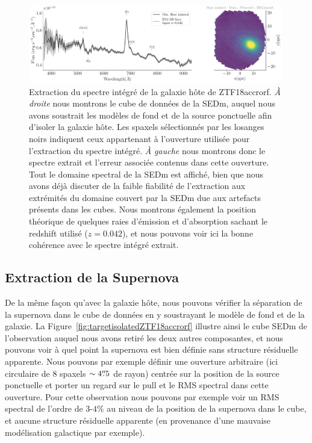 \documentclass[../main/main.tex]{subfiles}
\begin{document}
\begin{figure}[ht]
  \centering
  \includegraphics[width=0.99\textwidth]{../figures/07_scene/output_host_ZTF18accrorf.pdf}
  \caption[Extraction du spectre intégré de la galaxie hôte de
  ZTF18accrorf]{Extraction du spectre intégré de la galaxie hôte de
    ZTF18accrorf. \emph{À droite} nous montrons le cube de données de la
  SEDm, auquel nous avons soustrait les modèles de fond et de la source
  ponctuelle afin d'isoler la galaxie hôte. Les spaxels sélectionnés par
les losanges noirs indiquent ceux appartenant à l'ouverture utilisée
pour l'extraction du spectre intégré. \emph{À gauche} nous montrons donc le
spectre extrait et l'erreur associée contenus dans cette ouverture. Tout le domaine spectral
de la SEDm est affiché, bien que nous avons déjà discuter de la faible
fiabilité de l'extraction aux extrémités du domaine couvert par la SEDm due aux artefacts
présents dans les cubes. Nous montrons également la position
théorique de quelques raies d'émission et d'absorption sachant le
redshift utilisé ($z=0.042$), et nous pouvons voir ici la bonne cohérence avec le
spectre intégré extrait.}
  \label{fig:hostspecZTF18accrorf}
\end{figure}

\subsection{Extraction de la Supernova}\label{ssec:snextraction}

De la même façon qu'avec la galaxie hôte, nous pouvons vérifier la
séparation de la supernova dans le cube de données en y soustrayant le
modèle de fond et de la galaxie. La
Figure~\ref{fig:targetisolatedZTF18accrorf} illustre ainsi le cube SEDm
de l'observation auquel nous avons retiré les deux autres composantes,
et nous pouvons voir à quel point la supernova est bien définie sans
structure résiduelle apparente. Nous pouvons par exemple définir une
ouverture arbitraire (ici circulaire de $8$ spaxels $\sim4\overset{\prime\prime}{.}5$ de
rayon) centrée sur la position de la source ponctuelle et porter un
regard sur le pull et le RMS spectral dans cette ouverture. Pour cette
observation nous pouvons par exemple voir un RMS spectral de l'ordre de
$3$-$4\%$ au niveau de la position de la supernova dans le cube, et
aucune structure résiduelle apparente (en provenance d'une mauvaise
modélisation galactique par exemple).
\end{document}

